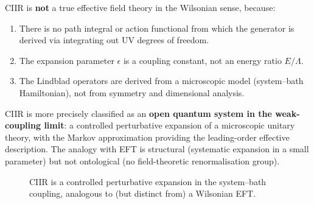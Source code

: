 \begin{remark}
\label{rem:c9:eft_class}
CIIR is \textbf{not} a true effective field theory in the
Wilsonian sense, because:
\begin{enumerate}
\item There is no path integral or action functional from which the
  generator is derived via integrating out UV degrees of freedom.
\item The expansion parameter $\epsilon$ is a coupling constant, not
  an energy ratio $E/\Lambda$.
\item The Lindblad operators are derived from a microscopic model
  (system--bath Hamiltonian), not from symmetry and dimensional analysis.
\end{enumerate}

CIIR is more precisely classified as an \textbf{open quantum system
in the weak-coupling limit}: a controlled perturbative expansion of a
microscopic unitary theory, with the Markov approximation providing
the leading-order effective description.  The analogy with EFT is
structural (systematic expansion in a small parameter) but not
ontological (no field-theoretic renormalisation group).
\end{remark}

\begin{figure}[t]
\centering
{}
\caption{CIIR is a controlled perturbative expansion in the system--bath
coupling, analogous to (but distinct from) a Wilsonian EFT.}
\label{fig:c9:eft}
\end{figure}


